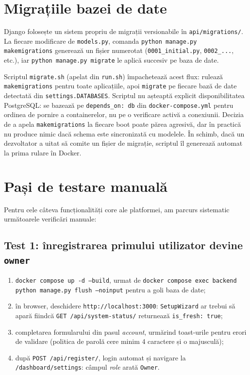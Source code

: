 \section{Migrațiile bazei de date}
Django folosește un sistem propriu de migrații versionabile în \texttt{api/migrations/}. La fiecare modificare de \texttt{models.py}, comanda \texttt{python manage.py makemigrations} generează un fișier numerotat (\texttt{0001\_initial.py}, \texttt{0002\_...}, etc.), iar \texttt{python manage.py migrate} le aplică succesiv pe baza de date.

Scriptul \texttt{migrate.sh} (apelat din \texttt{run.sh}) împachetează acest flux: rulează \texttt{makemigrations} pentru toate aplicațiile, apoi \texttt{migrate} pe fiecare bază de date detectată din \texttt{settings.DATABASES}. Scriptul nu așteaptă explicit disponibilitatea PostgreSQL: se bazează pe \texttt{depends\_on: db} din \texttt{docker-compose.yml} pentru ordinea de pornire a containerelor, nu pe o verificare activă a conexiunii. Decizia de a apela \texttt{makemigrations} la fiecare boot poate părea agresivă, dar în practică nu produce nimic dacă schema este sincronizată cu modelele. În schimb, dacă un dezvoltator a uitat să comite un fișier de migrație, scriptul îl generează automat la prima rulare în Docker.

\section{Pași de testare manuală}
Pentru cele câteva funcționalități core ale platformei, am parcurs sistematic următoarele verificări manuale:

\subsection{Test 1: înregistrarea primului utilizator devine \texttt{owner}}
\begin{enumerate}
    \item \texttt{docker compose up -d --build}, urmat de \texttt{docker compose exec backend python manage.py flush --noinput} pentru a goli baza de date;
    \item în browser, deschidere \texttt{http://localhost:3000}: \texttt{SetupWizard} ar trebui să apară fiindcă \texttt{GET /api/system-status/} returnează \texttt{is\_fresh: true};
    \item completarea formularului din pasul \emph{account}, urmărind toast-urile pentru erori de validare (politica de parolă cere minim 4 caractere și o majusculă);
    \item după \texttt{POST /api/register/}, login automat și navigare la \texttt{/dashboard/settings}: câmpul \emph{role} arată \texttt{Owner}.
\end{enumerate}

